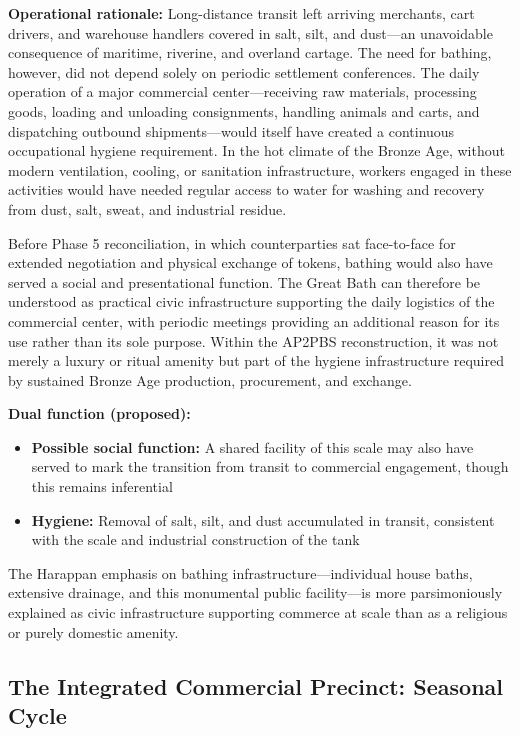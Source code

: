 \documentclass[12pt]{article}
\begin{document}
\textbf{Operational rationale:} Long-distance transit left arriving merchants,
cart drivers, and warehouse handlers covered in salt, silt, and dust---an
unavoidable consequence of maritime, riverine, and overland cartage. The need
for bathing, however, did not depend solely on periodic settlement conferences.
The daily operation of a major commercial center---receiving raw materials,
processing goods, loading and unloading consignments, handling animals and
carts, and dispatching outbound shipments---would itself have created a
continuous occupational hygiene requirement. In the hot climate of the Bronze
Age, without modern ventilation, cooling, or sanitation infrastructure, workers
engaged in these activities would have needed regular access to water for
washing and recovery from dust, salt, sweat, and industrial residue.

Before Phase 5 reconciliation, in which counterparties sat face-to-face for
extended negotiation and physical exchange of tokens, bathing would also have
served a social and presentational function. The Great Bath can therefore be
understood as practical civic infrastructure supporting the daily logistics of
the commercial center, with periodic meetings providing an additional reason
for its use rather than its sole purpose. Within the AP2PBS reconstruction, it
was not merely a luxury or ritual amenity but part of the hygiene infrastructure
required by sustained Bronze Age production, procurement, and exchange.

\textbf{Dual function (proposed):}
\begin{itemize}
\item \textbf{Possible social function:} A shared facility of this scale may
        also have served to mark the transition from transit to commercial
        engagement, though this remains inferential
\item \textbf{Hygiene:} Removal of salt, silt, and dust accumulated in transit,
        consistent with the scale and industrial construction of the tank
\end{itemize}

The Harappan emphasis on bathing infrastructure---individual house baths,
extensive drainage, and this monumental public facility---is more parsimoniously
explained as civic infrastructure supporting commerce at scale than as a
religious or purely domestic amenity.

\subsection{The Integrated Commercial Precinct: Seasonal Cycle}
\end{document}
